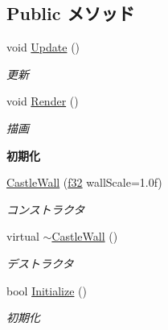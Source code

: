 \subsection*{Public メソッド}
\begin{DoxyCompactItemize}
\item 
void \hyperlink{class_castle_wall_a28e6f7c859aaab114467bf939dd520b4}{Update} ()
\begin{DoxyCompactList}\small\item\em 更新 \end{DoxyCompactList}\item 
void \hyperlink{class_castle_wall_af74bb0dae111bf8edda1621a709a6101}{Render} ()
\begin{DoxyCompactList}\small\item\em 描画 \end{DoxyCompactList}\end{DoxyCompactItemize}
\begin{Indent}{\bf 初期化}\par
\begin{DoxyCompactItemize}
\item 
\hyperlink{class_castle_wall_a69ab0cee2dd0a32ca3cde4f294ee6f6c}{Castle\-Wall} (\hyperlink{_main_8h_a5f6906312a689f27d70e9d086649d3fd}{f32} wall\-Scale=1.\-0f)
\begin{DoxyCompactList}\small\item\em コンストラクタ \end{DoxyCompactList}\item 
virtual \hyperlink{class_castle_wall_a24b57b6d45cf42c656ea9780377d061e}{$\sim$\-Castle\-Wall} ()
\begin{DoxyCompactList}\small\item\em デストラクタ \end{DoxyCompactList}\item 
bool \hyperlink{class_castle_wall_ac54f533305cdf7e2f3a5403c74d90db7}{Initialize} ()
\begin{DoxyCompactList}\small\item\em 初期化 \end{DoxyCompactList}\end{DoxyCompactItemize}
\end{Indent}
